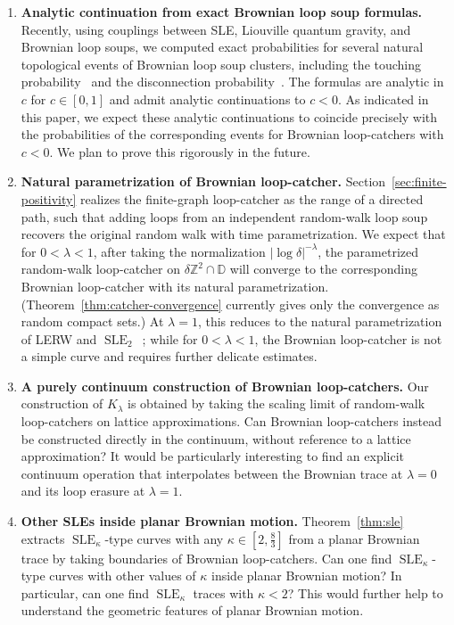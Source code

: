 \documentclass[11pt]{article}
\numberwithin{equation}{section}
\newcommand{\D}{\mathbb{D}}
\newcommand{\Z}{\mathbb{Z}}
\newcommand{\1}{\mathbf{1}}
\DeclareMathOperator{\SLE}{SLE}
\begin{document}
\begin{enumerate}[label=\textbf{\arabic*.},leftmargin=*]

\item \textbf{Analytic continuation from exact Brownian loop soup formulas.}
Recently, using couplings between SLE, Liouville quantum gravity, and Brownian loop soups, we computed exact probabilities for several natural topological events of Brownian loop soup clusters, including the touching probability~\cite{touching} and the disconnection probability~\cite{CFSX25,BM-intersection}.  The formulas are analytic in $c$ for $c\in[0,1]$ and admit analytic continuations to $c<0$. As indicated in this paper, we expect these analytic continuations to coincide precisely with the probabilities of the corresponding events for Brownian loop-catchers with $c<0$.  We plan to prove this rigorously in the future.

\item \textbf{Natural parametrization of Brownian loop-catcher.}
Section~\ref{sec:finite-positivity} realizes the finite-graph loop-catcher as the range of a directed path, such that adding loops from an independent random-walk loop soup recovers the original random walk with time parametrization.  We expect that for $0<\lambda<1$, after taking the normalization $|\log\delta|^{-\lambda}$, the parametrized random-walk loop-catcher on $\delta\Z^2\cap\D$ will converge to the corresponding Brownian loop-catcher with its natural parametrization. (Theorem~\ref{thm:catcher-convergence} currently gives only the convergence as random compact sets.)  At $\lambda=1$, this reduces to the natural parametrization of LERW and $\SLE_2$~\cite{lawler-viklund-lerw-nat}; while for $0<\lambda<1$, the Brownian loop-catcher is not a simple curve and requires further delicate estimates.

\item \textbf{A purely continuum construction of Brownian loop-catchers.}
Our construction of $K_\lambda$ is obtained by taking the scaling limit of random-walk loop-catchers on lattice approximations.  Can Brownian loop-catchers instead be constructed directly in the continuum, without reference to a lattice approximation?  It would be particularly interesting to find an explicit continuum operation that interpolates between the Brownian trace at $\lambda=0$ and its loop erasure at $\lambda=1$.

\item \textbf{Other SLEs inside planar Brownian motion.}
Theorem~\ref{thm:sle} extracts $\SLE_\kappa$-type curves with any $\kappa\in[2,\frac{8}{3}]$ from a planar Brownian trace by taking boundaries of Brownian loop-catchers.  Can one find $\SLE_\kappa$-type curves with other values of $\kappa$ inside planar Brownian motion?  In particular, can one find $\SLE_\kappa$ traces with $\kappa<2$?  This would further help to understand the geometric features of planar Brownian motion.

\end{enumerate}
\end{document}
